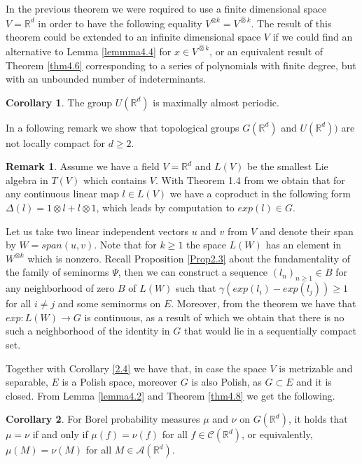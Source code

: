 \documentclass[12pt,a4paper]{report}
\theoremstyle{definition}
\newtheorem{corollary}{Corollary}
\newtheorem{remark}{Remark}
\begin{document}
In the previous theorem we were required to use a finite dimensional space $V=\mathbb{R}^d$ in order to have the following equality $V^{\otimes k}=V^{\hat{\otimes} k}$. The result of this theorem could be extended to an infinite dimensional space $V$ if we could find an alternative to Lemma \ref{lemmma4.4} for $x\in V^{\hat{\otimes} k}$, or an equivalent result of Theorem \ref{thm4.6} corresponding to a series of polynomials with finite degree, but with an unbounded number of indeterminants.

\begin{corollary}
	The group $U(\mathbb{R}^d)$ is maximally almost periodic.
\end{corollary}

In a following remark we show that topological groups $G(\mathbb{R}^d)$ and $U(\mathbb{R}^d))$ are not locally compact for $d\geq 2$.
\begin{remark}
	Assume we have a field $V=\mathbb{R}^d$ and $L(V)$ be the smallest Lie algebra in $T(V)$ which contains $V$. With Theorem 1.4 from \parencite{reutenauer1993free} we obtain that for any continuous linear map $l \in L(V)$ we have a coproduct in the following form $\Delta(l)=1\otimes l+ l\otimes 1$, which leads by computation to $exp(l)\in G$.
\end{remark}

Let us take two linear independent vectors $u$ and $v$ from $V$ and denote their span by $W = span (u, v)$. Note that for $k\geq 1$ the space $L(W)$ has an element in $W^{\otimes k}$ which is nonzero.
Recall Proposition \ref{Prop2.3} about the fundamentality of the family of seminorms $\Psi$, then we can construct a sequence $(l_n)_{n\geq 1} \in B $ for any neighborhood of zero $B$ of $L(W)$ such that $\gamma(exp(l_i)-exp(l_j))\geq 1$ for all $i\neq j$ and some seminorms on $E$. Moreover, from the theorem \parencite[][Theorem 3]{arens1946space} we have that $exp:L(W)\rightarrow G$ is continuous, as a result of which we obtain that there is no such a neighborhood of the identity in $G$ that would lie in a sequentially compact set.

Together with Corollary \ref{2.4} we have that, in case the space $V$ is metrizable and separable, $E$ is a Polish space, moreover $G$ is also Polish, as $G \subset E$ and it is closed. From Lemma \ref{lemma4.2} and Theorem \ref{thm4.8} we get the following.

\begin{corollary} \label{Cor4.12}
	For Borel probability measures $\mu$ and $\nu$ on $G(\mathbb{R}^d)$, it holds that $\mu = \nu$ if and only if $\mu(f) = \nu(f)$ for all $f \in \mathcal{C}(\mathbb{R}^d)$, or equivalently, $\mu(M) = \nu(M)$	for all $M \in \mathcal{A}(\mathbb{R}^d)$.
\end{corollary}
\end{document}
